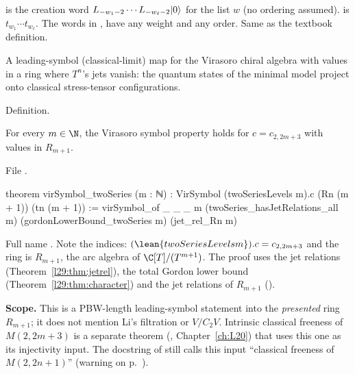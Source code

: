 \begin{dictionary}
 is the creation word $L_{-w_1-2}\cdots L_{-w_\ell-2}|0\rangle$ for the list $w$ (no
ordering assumed).  is $t_{w_1}\cdots t_{w_\ell}$. The words in ,  have
any weight and any order. Same as the textbook definition.
\end{dictionary}

\begin{physics}
A leading-symbol (classical-limit) map for the Virasoro chiral algebra with values in a ring where $T^{n}$'s jets vanish:
the quantum states of the minimal model project onto classical stress-tensor configurations.
\end{physics}

\begin{status}
Definition.
\end{status}

\begin{theorem}\label{l29:thm:virsymbol}
For every $m\in\N$, the Virasoro symbol property holds for $c=c_{2,2m+3}$ with values in $R_{m+1}$.
\end{theorem}

\noindent File .
\begin{leancode}
theorem virSymbol_twoSeries (m : ℕ) :
    VirSymbol (twoSeriesLevels m).c (Rn (m + 1)) (tn (m + 1)) :=
  virSymbol_of _ _ _ m (twoSeries_hasJetRelations_all m) (gordonLowerBound_twoSeries m)
    (jet_rel_Rn m)
\end{leancode}

\begin{dictionary}
Full name . Note the indices: $(\lean{twoSeriesLevels m}).c=c_{2,2m+3}$
and the ring is $R_{m+1}$, the arc algebra of $\C[T]/(T^{m+1})$. The proof uses the jet relations
(Theorem~\ref{l29:thm:jetrel}), the total Gordon lower bound (Theorem~\ref{l29:thm:character}) and the jet relations of
$R_{m+1}$ ().

\textbf{Scope.} This is a PBW-length leading-symbol statement into the \emph{presented} ring $R_{m+1}$; it does not
mention Li's filtration or $V/C_2V$. Intrinsic classical freeness of $M(2,2m+3)$ is a separate theorem
(, Chapter~\ref{ch:L20}) that uses this one as its injectivity
input. The docstring of  still calls this input ``classical freeness of $M(2,2n+1)$''
(warning on p.~\pageref{l29:warn:stale}).
\end{dictionary}

